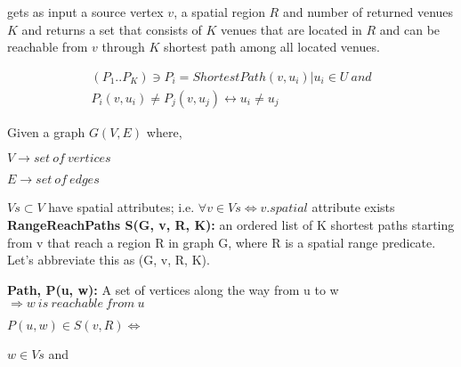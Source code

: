 {\query} gets as input a source vertex $v$, a spatial region $R$ and number of returned venues $K$ and returns a set that consists of $K$ venues that are located in $R$ and can be reachable from $v$ through $K$ shortest path among all located venues.

\iffalse
\begin{eqnarray*}
  	(P_1..P_K) \ni P_i = ShortestPath(v, u_i) | u_i \in U\ and\\
  	P_i(v, u_i) \neq P_j(v, u_j) \leftrightarrow u_i \neq u_j
\end{eqnarray*}


Given a graph $G(V, E)$ where,

\quad$V \rightarrow set\ of\ vertices$

\quad$E \rightarrow set\ of\ edges$

$Vs \subset V$ have spatial attributes; i.e. $\forall v \in Vs \Leftrightarrow v.spatial$ attribute exists\\


\textbf{RangeReachPaths S(G, v, R, K):} an ordered list of K shortest paths starting from v that reach a region R in graph G, where R is a spatial range predicate. Let's abbreviate this as {\rrp}(G, v, R, K).

\textbf{Path, P(u, w):} A set of vertices along the way from u to w \(\Rightarrow w\ is\ reachable\ from\ u\)

\quad${P(u, w) \in S(v, R) \Leftrightarrow}$

\quad{}

\quad\quad${w \in Vs}$ and

